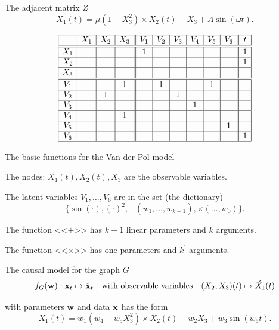 \documentclass{beamer}
\begin{document}
\begin{frame}[c]{The adjacent matrix $Z$}
\[
X_1(t) =  \mu(1-X_3^2) \times X_2(t) -  X_3+A \sin(\omega t).
\]

\bigskip
\[
\begin{array}{|c|c|c|c||c|c|c|c|c|c||c|}
\hline
     & X_1 & X_2 & X_3 & V_1 & V_2 & V_3 & V_4 & V_5 & V_6 & t \\
\hline \hline
X_1 &   &   &   & 1 &   &   &   &   &   & 1 \\
\hline
X_2 &   &   &   &   &   &   &   &   &   & 1 \\
\hline
X_3 &   &   &   &   &   &   &   &   &   &   \\
\hline  \hline
V_1 &   &   & 1 &   & 1 &   &  & 1  &   &   \\
\hline
V_2 &   & 1 &   &   &   & 1 &   &   &   &   \\
\hline
V_3 &   &   &   &   &   &   & 1 &   &   &   \\
\hline
V_4 &   &   & 1 &   &   &   &   &   &   &   \\
\hline
V_5 &   &   &   &   &   &   &   &   & 1 &   \\
\hline
V_6 &   &   &   &   &   &   &   &   &   & 1 \\
\hline
\end{array}
\]

\end{frame}
\begin{frame}{The basic functions for the Van der Pol model}

The nodes: $X_1(t), X_2(t), X_3$ are the observable variables.%

\bigskip
The latent variables $V_1,\dots,V_6$ are in the set  (the dictionary)
\[
 \{\sin(\cdot), (\cdot)^2, +(w_1,\dots,w_{k+1}), \times(\dots, w_0) \}.
\]

The function <<$+$>> has $k+1$ linear parameters and $k$ arguments. 

The function <<$\times$>> has one parameters and $k^\prime$ arguments. 

\bigskip
The causal model for the graph $G$ 
\[
f_G(\mathbf{w}): \mathbf{x}_t \mapsto \hat{\mathbf{x}}_t \quad \text{with observable variables}\quad (X_2,X_3)(t) \mapsto \hat{X_1}(t)
\]

with parameters $\mathbf{w}$ and data $\mathbf{x}$ has the form
\[
X_1(t) = w_1(w_4-w_5 X_3^2) \times X_2(t) - w_2 X_3 + w_3 \sin(w_6 t).
\]


\end{frame}
\end{document}

